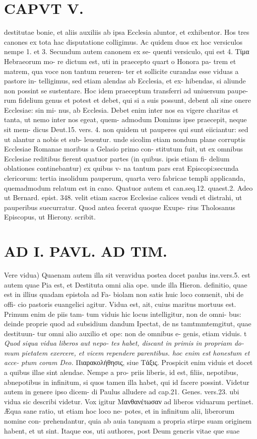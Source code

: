 \documentclass{article}
\begin{document}
\begin{pages}
\section*{CAPVT  V. }
\marginpar{[ p.83 ]}destitutae bonie, et aliis auxiliis ab ipsa Ecclesia aluntor, et exhibentor. Hos tres canones ex tota hac disputatione colligimus. Ac quidem duos ex hoc versiculos nempe 1. et 3. Secundum autem canonem ex se- quenti versiculo, qui est 4. Tίμα Hebraeorum mo- re dictum est, uti in praecepto quart o Honora pa- trem et matrem, qua voce non tantum reueren- ter et sollicite curandas esse viduas a pastore in- telligimus, sed etiam alendas ab Ecclesia, et ex- hibendas, si aliunde non possint se sustentare. Hoc idem praeceptum transferri ad uniuersum paupe- rum fidelium genus et potest et debet, qui si a suis possunt, debent ali sine onere Ecclesiae: sin mi- nus, ab Ecclesia. Debet enim inter nos ea vigere charitas et tanta, ut nemo inter nos egeat, quem- admodum Dominus ipse praecepit, neque sit mem- dicus Deut.15. vers. 4. non quidem ut pauperes qui sunt eiiciantur: sed ut alantur a nobis et sub- leuentur. unde sicolim etiam nondum plane corruptis Ecclesiae Romanae moribus a Gelasio primo con- stitutum fuit, ut ex omnibus Ecclesiae reditibus fierent quatuor partes (in quibus. ipsis etiam fi- delium oblationes continebantur) ex quibus v- na tantum pars erat Episcopi:secunda clericorum: tertia insolidum pauperum, quarta vero fabricae templi applicanda, quemadmodum relatum est in cano. Quatuor autem et can.seq.12. quaest.2. Adeo ut Bernard. epist. 348. velit etiam sacros Ecclesiae calices vendi et distrahi, ut pauperibus suecurratur. Quod antea fecerat quoque Exupe- rius Tholosanus Episcopus, ut Hierony. scribit. 
\section*{AD I. PAVL. AD TIM. }
\marginpar{[ p.254 ]}Vere vidua) Quaenam autem illa sit veravidua postea docet paulus ins.vers.5. est autem quae Pia est, et Destituta omni alia ope. unde illa Hieron. definitio, quae est in illius quadam epistola ad Fa- biolam non satis huic loco conuenit, ubi de offi- cio pastoris euangelici agitur. Vidua est, ait, cuius maritus mortuus est. Primum enim de piis tam- tum viduis hic locus intelligitur, non de omni- bus: deinde proprie quod ad subsidium dandum Ipectat, de ns tamtmmtemgitut, quae destituun- tur omni alio auxilio et ope: non de omnibus e- genis, etiam viduis. t \textit{Quod siqua vidua liberos aut nepo-} \textit{tes habet, discant in primis in propriam do-} \textit{mum pietatem exercere, et vicem rependere} \textit{parentibus. hoc enim est honestum et acce-} \textit{ptum coram Deo.} Πιαρακολήθησις, siue Τάξις. Prospicit enim viduis et docet a quibus illae sint alendae. Nempe a pro- priis liberis, id est, filiis, nepotibus, abnepotibus in infinitum, si quos tamen illa habet, qui id facere possint. Videtur autem in genere ipso dicem- di Paulus alludere ad cap.21. Genes. vers.23. ubi vidua sic describi videtur. Vox igitur Μανθανέτωσαν ad liberos viduarum pertinet. Æqua sane ratio, ut etiam hoc loco ne- potes, et in infinitum alii, liberorum nomine con- prehendantur, quia ab auia tanquam a propria stirpe suam originem habent, et ut sint. Itaque eos, uti authores, post Deum gencris vitae que suae 

\end{pages}
\end{document}
